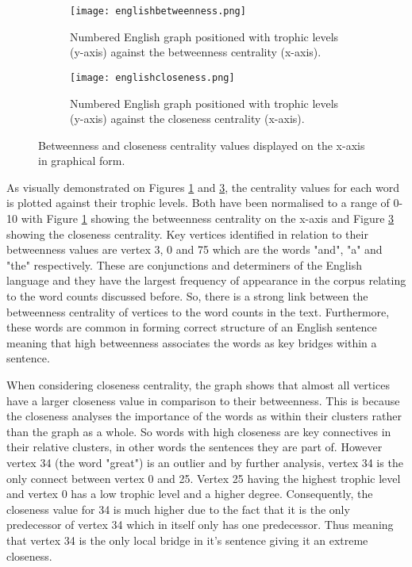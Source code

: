 \begin{figure}[H]
\centering
\begin{subfigure}{.45\textwidth}
	\hspace{-1cm} 
	\texttt{[image: englishbetweenness.png]}
	\caption{Numbered English graph positioned with trophic levels (y-axis) against the betweenness centrality (x-axis).}
	\label{fig:engbc}
\end{subfigure}
\hfill
\begin{subfigure}{.45\textwidth}
	\hspace{-1cm} 
	\texttt{[image: englishcloseness.png]}
	\caption{Numbered English graph positioned with trophic levels (y-axis) against the closeness centrality (x-axis).}
	\label{fig:engcc}
\end{subfigure}
\caption{Betweenness and closeness centrality values displayed on the x-axis in graphical form.}
\end{figure}

As visually demonstrated on Figures \ref{fig:engbc} and \ref{fig:engcc}, the centrality values for each word is plotted against their trophic levels. Both have been normalised to a range of 0-10 with Figure \ref{fig:engbc} showing the betweenness centrality on the x-axis and Figure \ref{fig:engcc} showing the closeness centrality. Key vertices identified in relation to their betweenness values are vertex 3, 0 and 75 which are the words "and", "a" and "the" respectively. These are conjunctions and determiners of the English language and they have the largest frequency of appearance in the corpus relating to the word counts discussed before. So, there is a strong link between the betweenness centrality of vertices to the word counts in the text. Furthermore, these words are common in forming correct structure of an English sentence meaning that high betweenness associates the words as key bridges within a sentence. 

When considering closeness centrality, the graph shows that almost all vertices have a larger closeness value in comparison to their betweenness. This is because the closeness analyses the importance of the words as within their clusters rather than the graph as a whole. So words with high closeness are key connectives in their relative clusters, in other words the sentences they are part of. However vertex 34 (the word "great") is an outlier and by further analysis, vertex 34 is the only connect between vertex 0 and 25. Vertex 25 having the highest trophic level and vertex 0 has a low trophic level and a higher degree. Consequently, the closeness value for 34 is much higher due to the fact that it is the only predecessor of vertex 34 which in itself only has one predecessor. Thus meaning that vertex 34 is the only local bridge in it's sentence giving it an extreme closeness.

